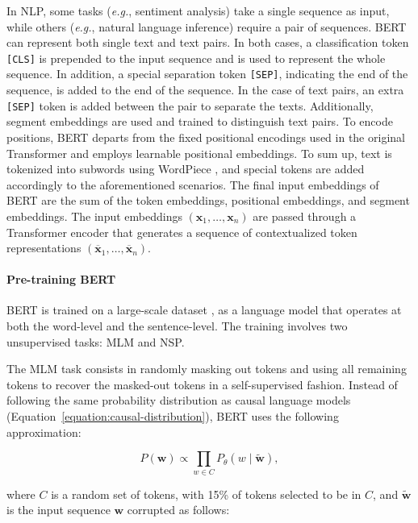 In \ac{NLP}, some tasks (\textit{e.g.}, sentiment analysis) take a single sequence as input, while others (\textit{e.g.}, natural language inference) require a pair of sequences. \ac{BERT} can represent both single text and text pairs. In both cases, a classification token \texttt{[CLS]} is prepended to the input sequence and is used to represent the whole sequence. In addition, a special separation token \texttt{[SEP]}, indicating the end of the sequence, is added to the end of the sequence. In the case of text pairs, an extra \texttt{[SEP]} token is added between the pair to separate the texts. Additionally, segment embeddings are used and trained to distinguish text pairs. To encode positions, \ac{BERT} departs from the fixed positional encodings used in the original Transformer and employs learnable positional embeddings. To sum up, text is tokenized into subwords using WordPiece \citep{wu2016google}, and special tokens are added accordingly to the aforementioned scenarios. The final input embeddings of \ac{BERT} are the sum of the token embeddings, positional embeddings, and segment embeddings. The input embeddings $(\bm{x}_1, \ldots, \bm{x}_n)$ are passed through a Transformer encoder that generates a sequence of contextualized token representations $(\overline{\bm{x}}_1, \ldots, \overline{\bm{x}}_n)$.

\paragraph{Pre-training BERT}

\ac{BERT} is trained on a large-scale dataset \citep{zhu2015aligning}, as a language model that operates at both the word-level and the sentence-level. The training involves two unsupervised tasks: \ac{MLM} and \ac{NSP}. 

The \ac{MLM} task consists in randomly masking out tokens and using all remaining tokens to recover the masked-out tokens in a self-supervised fashion. Instead of following the same probability distribution as causal language models (Equation~\ref{equation:causal-distribution}), \ac{BERT} uses the following approximation:

\begin{equation}
    P(\bm{w}) \propto \prod_{w \in C} P_{\theta} \left(w \mid \tilde{\bm{w}}\right),
\end{equation}

\noindent where $C$ is a random set of tokens, with 15\% of tokens selected to be in $C$, and $\tilde{\bm{w}}$ is the input sequence $\bm{w}$ corrupted as follows:

